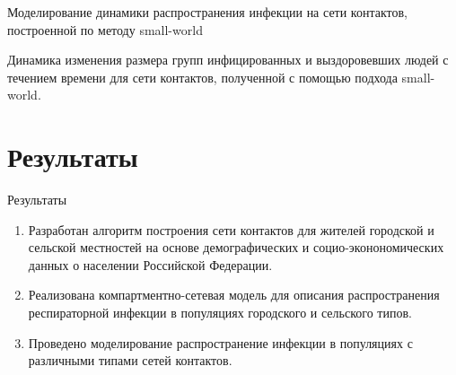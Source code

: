 \documentclass[10pt, unicode, xcolor={svgnames, table, hyperref}]{beamer}
\begin{document}
\begin{frame}{Моделирование динамики распространения инфекции на сети контактов, построенной по методу small-world}
\begin{figure}[h!]
\begin{minipage}{0.49\textwidth}
		\end{minipage}
	\end{figure}
	Динамика изменения размера групп инфицированных и выздоровевших людей с течением времени для сети контактов, полученной с помощью подхода small-world.

	
\end{frame}






\section{\small Результаты}

\begin{frame}{Результаты}
	
	
	\begin{enumerate}
		\item Разработан алгоритм построения сети контактов для жителей городской и сельской местностей на основе демографических и социо-эконономических данных о населении Российской Федерации.
		
		\item  Реализована компартментно-сетевая модель для описания распространения респираторной инфекции в популяциях городского и сельского типов.
		
		\item Проведено моделирование распространение инфекции в популяциях с различными типами сетей контактов.
	\end{enumerate}
\end{frame}
\end{document}
